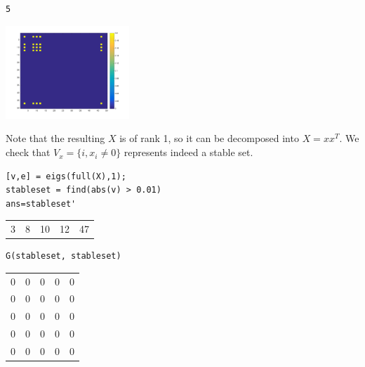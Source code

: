 \documentclass[11pt]{article}
\begin{document}
\begin{verbatim}
5
\end{verbatim}










\begin{org}
\begin{center}
\includegraphics[width=0.35\textwidth]{X.png}
\end{center}
\end{org}




Note that the resulting \(X\) is of rank 1, so it can be decomposed into \(X = xx^T\). We check that \(V_x = \{i , x_i \ne 0\}\) represents indeed a stable set.
\begin{verbatim}
[v,e] = eigs(full(X),1);
stableset = find(abs(v) > 0.01)  
ans=stableset'
\end{verbatim}

\begin{center}
\begin{tabular}{rrrrr}
3 & 8 & 10 & 12 & 47\\
\end{tabular}
\end{center}


\begin{verbatim}
G(stableset, stableset)
\end{verbatim}

\begin{org}
\begin{center}
\begin{tabular}{rrrrr}
0 & 0 & 0 & 0 & 0\\
0 & 0 & 0 & 0 & 0\\
0 & 0 & 0 & 0 & 0\\
0 & 0 & 0 & 0 & 0\\
0 & 0 & 0 & 0 & 0\\
\end{tabular}
\end{center}
\end{org}
\end{document}
